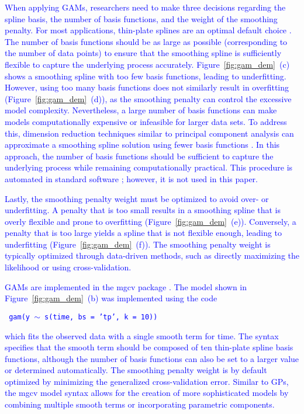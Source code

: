 \documentclass[man, floatsintext]{apa7}
\begin{document}
\textcolor{blue}{
  When applying GAMs, researchers need to make three decisions regarding the
  spline basis, the number of basis functions, and the weight of the smoothing
  penalty. For most applications, thin-plate splines are an optimal default
  choice \parencite{wood_generalized_2006}. The number of basis functions
  should be as large as possible (corresponding to the number of data points)
  to ensure that the smoothing spline is sufficiently flexible to capture the
  underlying process accurately. Figure~\ref{fig:gam_dem}~(c) shows a smoothing
  spline with too few basis functions, leading to underfitting. However, using
  too many basis functions does not similarly result in overfitting
  (Figure~\ref{fig:gam_dem}~(d)), as the smoothing penalty can control the
  excessive model complexity. Nevertheless, a large number of basis functions
  can make models computationally expensive or infeasible for larger data sets.
  To address this, dimension reduction techniques similar to principal
  component analysis can approximate a smoothing spline solution using fewer
  basis functions \parencite{wood_thin_2003}. In this approach, the number of
  basis functions should be sufficient to capture the underlying process while
  remaining computationally practical. This procedure is automated in standard
  software \parencite{R-mgcv_a}; however, it is not used in this paper.}

\textcolor{blue}{
  Lastly, the smoothing penalty weight must be optimized to avoid over- or
  underfitting. A penalty that is too small results in a smoothing spline that
  is overly flexible and prone to overfitting (Figure~\ref{fig:gam_dem}~(e)).
  Conversely, a penalty that is too large yields a spline that is not flexible
  enough, leading to underfitting (Figure~\ref{fig:gam_dem}~(f)). The smoothing
  penalty weight is typically optimized through data-driven methods, such as
  directly maximizing the likelihood or using cross-validation.
}

\textcolor{blue}{ GAMs are implemented in the mgcv package
  \parencite{R-mgcv_a}. The model shown in Figure~\ref{fig:gam_dem}~(b) was
  implemented using the code}

\noindent
\textcolor{blue}{\fontsize{10}{12}\selectfont\texttt{ gam(y $\sim$
    s(time, bs = 'tp', k = 10)) }}

\noindent\textcolor{blue}{which fits the observed data with a single
  smooth term for time. The syntax specifies that the smooth term should be
  composed of ten thin-plate spline basis functions, although the number of
  basis functions can also be set to a larger value or determined
  automatically. The smoothing penalty weight is by default optimized
  by minimizing the generalized cross-validation error. Similar to GPs, the
  mgcv model syntax allows for the creation of more sophisticated models by
  combining multiple smooth terms or incorporating parametric components. }
\end{document}
